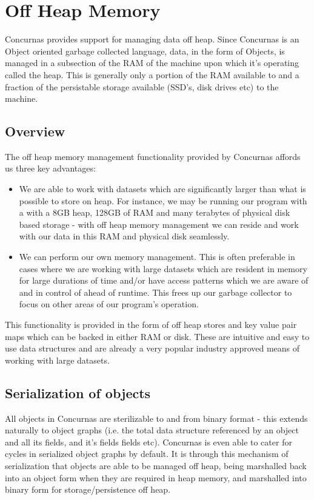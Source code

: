 \documentclass[conc-doc]{subfiles}
\begin{document}
	
	\chapter[Off Heap Memory]{Off Heap Memory}

Concurnas provides support for managing data off heap. Since Concurnas is an Object oriented garbage collected language, data, in the form of Objects, is managed in a subsection of the RAM of the machine upon which it's operating called the heap. This is generally only a portion of the RAM available to and a fraction of the persistable storage available (SSD's, disk drives etc) to the machine.

\section{Overview}
The off heap memory management functionality provided by Concurnas affords us three key advantages: 

\begin{itemize}
	\item We are able to work with datasets which are significantly larger than what is possible to store on heap. For instance, we may be running our program with a with a 8GB heap, 128GB of RAM and many terabytes of physical disk based storage - with off heap memory management we can reside and work with our data in this RAM and physical disk seamlessly.
	\item We can perform our own memory management. This is often preferable in cases where we are working with large datasets which are resident in memory for large durations of time and/or have access patterns which we are aware of and in control of ahead of runtime. This frees up our garbage collector to focus on other areas of our program's operation.
\end{itemize}

This functionality is provided in the form of off heap stores and key value pair maps which can be backed in either RAM or disk. These are intuitive and easy to use data structures and are already a very popular industry approved means of working with large datasets.

\section{Serialization of objects}
All objects in Concurnas are sterilizable to and from binary format - this extends naturally to object graphs (i.e. the total data structure referenced by an object and all its fields, and it's fields fields etc). Concurnas is even able to cater for cycles in serialized object graphs by default. It is through this mechanism of serialization that objects are able to be managed off heap, being marshalled back into an object form when they are required in heap memory, and marshalled into binary form for storage/persistence off heap.
\end{document}
